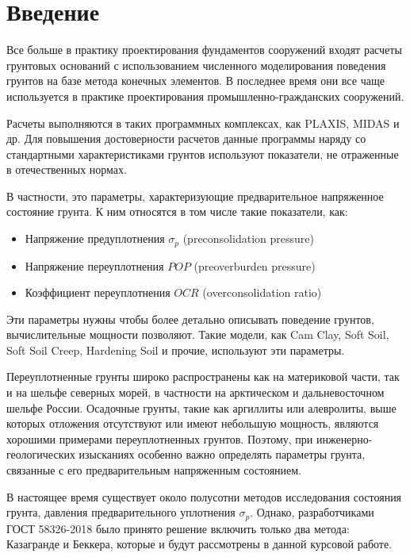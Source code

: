 \chapter*{Введение}                         %

Все больше в практику проектирования фундаментов сооружений входят расчеты грунтовых оснований с использованием численного моделирования поведения грунтов на базе метода конечных элементов. 
В последнее время они все чаще используется в практике проектирования промышленно-гражданских сооружений. 

Расчеты выполняются в таких программных комплексах, как PLAXIS, MIDAS и др. 
Для повышения достоверности расчетов данные программы наряду со стандартными характеристиками грунтов используют показатели, не отраженные в отечественных нормах. 

В частности, это параметры, характеризующие предварительное напряженное состояние грунта. 
К ним относятся в том числе такие показатели, как:
\begin{itemize}
    \item Напряжение предуплотнения $\sigma_p$ (preconsolidation pressure)
    \item Напряжение переуплотнения $POP$ (preoverburden pressure)
    \item Коэффициент переуплотнения $OCR$ (overconsolidation ratio)
\end{itemize}
Эти параметры нужны чтобы более детально описывать поведение грунтов, вычислительные мощности позволяют. 
Такие модели, как Cam Clay, Soft Soil, Soft Soil Creep, Hardening Soil и прочие, используют эти параметры. 

Переуплотненные грунты широко распространены как на материковой части, так и на шельфе северных морей, в частности на арктическом и дальневосточном шельфе России.
Осадочные грунты, такие как аргиллиты или алевролиты, выше которых отложения отсутствуют или имеют небольшую мощность, являются хорошими примерами переуплотненных грунтов.
Поэтому, при инженерно-геологических изысканиях особенно важно определять параметры грунта, связанные с его предварительным напряженным состоянием.

В настоящее время существует около полусотни  методов исследования  состояния грунта, давления предварительного уплотнения $\sigma_p$. 
Однако, разработчиками ГОСТ 58326-2018 было принято решение включить только два метода: Казагранде и Беккера, которые и будут рассмотрены в данной курсовой работе. 

